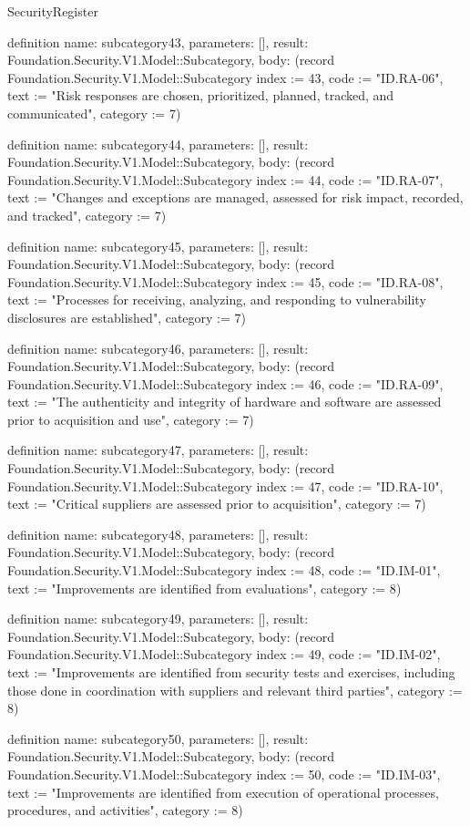 \begin{lexlean}{SecurityRegister}
\begin{semanticmodule}
definition{
  name: subcategory43,
  parameters: [],
  result: Foundation.Security.V1.Model::Subcategory,
  body: (record Foundation.Security.V1.Model::Subcategory {index := 43, code := "ID.RA-06", text := "Risk responses are chosen, prioritized, planned, tracked, and communicated", category := 7})
}

definition{
  name: subcategory44,
  parameters: [],
  result: Foundation.Security.V1.Model::Subcategory,
  body: (record Foundation.Security.V1.Model::Subcategory {index := 44, code := "ID.RA-07", text := "Changes and exceptions are managed, assessed for risk impact, recorded, and tracked", category := 7})
}

definition{
  name: subcategory45,
  parameters: [],
  result: Foundation.Security.V1.Model::Subcategory,
  body: (record Foundation.Security.V1.Model::Subcategory {index := 45, code := "ID.RA-08", text := "Processes for receiving, analyzing, and responding to vulnerability disclosures are established", category := 7})
}

definition{
  name: subcategory46,
  parameters: [],
  result: Foundation.Security.V1.Model::Subcategory,
  body: (record Foundation.Security.V1.Model::Subcategory {index := 46, code := "ID.RA-09", text := "The authenticity and integrity of hardware and software are assessed prior to acquisition and use", category := 7})
}

definition{
  name: subcategory47,
  parameters: [],
  result: Foundation.Security.V1.Model::Subcategory,
  body: (record Foundation.Security.V1.Model::Subcategory {index := 47, code := "ID.RA-10", text := "Critical suppliers are assessed prior to acquisition", category := 7})
}

definition{
  name: subcategory48,
  parameters: [],
  result: Foundation.Security.V1.Model::Subcategory,
  body: (record Foundation.Security.V1.Model::Subcategory {index := 48, code := "ID.IM-01", text := "Improvements are identified from evaluations", category := 8})
}

definition{
  name: subcategory49,
  parameters: [],
  result: Foundation.Security.V1.Model::Subcategory,
  body: (record Foundation.Security.V1.Model::Subcategory {index := 49, code := "ID.IM-02", text := "Improvements are identified from security tests and exercises, including those done in coordination with suppliers and relevant third parties", category := 8})
}

definition{
  name: subcategory50,
  parameters: [],
  result: Foundation.Security.V1.Model::Subcategory,
  body: (record Foundation.Security.V1.Model::Subcategory {index := 50, code := "ID.IM-03", text := "Improvements are identified from execution of operational processes, procedures, and activities", category := 8})
}


\end{semanticmodule}
\end{lexlean}

